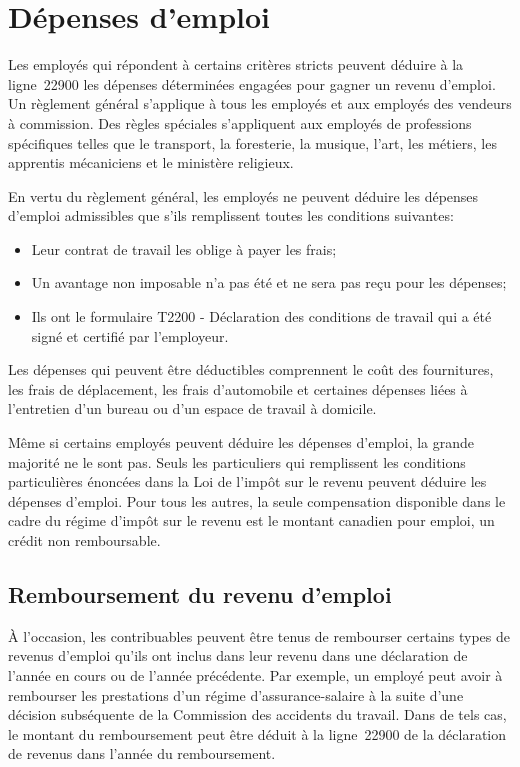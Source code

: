 \section{Dépenses d'emploi}
\begin{intro}
	Les employés qui répondent à certains critères stricts peuvent déduire à la ligne~22900 les dépenses déterminées engagées pour gagner un revenu d'emploi. Un règlement général s'applique à tous les employés et aux employés des vendeurs à commission. Des règles spéciales s'appliquent aux employés de professions spécifiques telles que le transport, la foresterie, la musique, l'art, les métiers, les apprentis mécaniciens et le ministère religieux.
\end{intro}

En vertu du règlement général, les employés ne peuvent déduire les dépenses d'emploi admissibles que s'ils remplissent toutes les conditions suivantes:
\begin{itemize}
	\item Leur contrat de travail les oblige à payer les frais;
	\item Un avantage non imposable n'a pas été et ne sera pas reçu pour les dépenses; 
	\item Ils ont le formulaire T2200 - Déclaration des conditions de travail qui a été signé et certifié par l'employeur.
\end{itemize}

Les dépenses qui peuvent être déductibles comprennent le coût des fournitures, les frais de déplacement, les frais d'automobile et certaines dépenses liées à l'entretien d'un bureau ou d'un espace de travail à domicile.

Même si certains employés peuvent déduire les dépenses d'emploi, la grande majorité ne le sont pas. Seuls les particuliers qui remplissent les conditions particulières énoncées dans la Loi de l'impôt sur le revenu peuvent déduire les dépenses d'emploi. Pour tous les autres, la seule compensation disponible dans le cadre du régime d'impôt sur le revenu est le montant canadien pour emploi, un crédit non remboursable.


\subsection{Remboursement du revenu d'emploi}
À l'occasion, les contribuables peuvent être tenus de rembourser certains types de revenus d'emploi qu'ils ont inclus dans leur revenu dans une déclaration de l'année en cours ou de l'année précédente. Par exemple, un employé peut avoir à rembourser les prestations d'un régime d'assurance-salaire à la suite d'une décision subséquente de la Commission des accidents du travail. Dans de tels cas, le montant du remboursement peut être déduit à la ligne~22900 de la déclaration de revenus dans l'année du remboursement.

